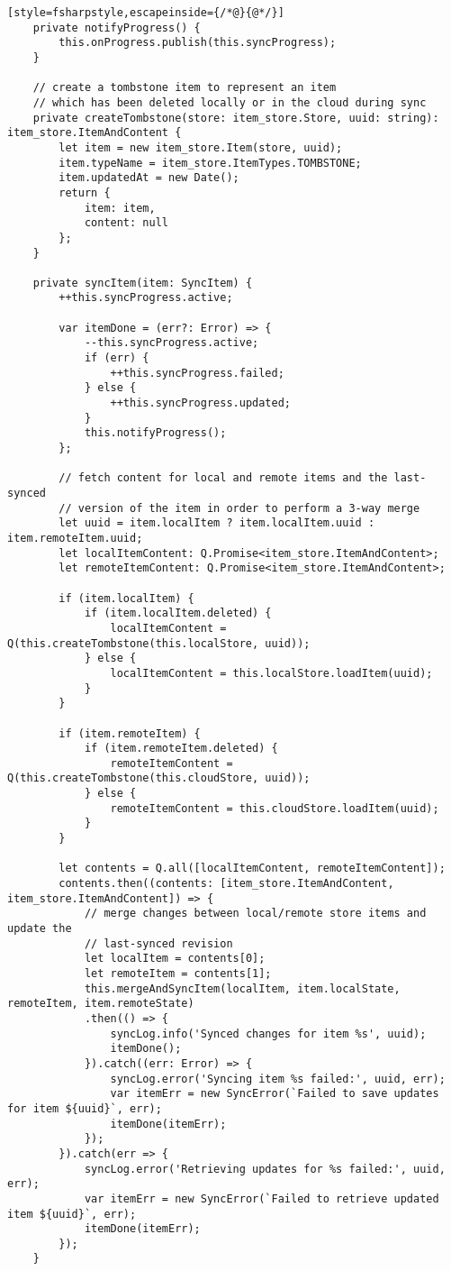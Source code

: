 \begin{lstlisting}[style=fsharpstyle,escapeinside={/*@}{@*/}]
	private notifyProgress() {
		this.onProgress.publish(this.syncProgress);
	}

	// create a tombstone item to represent an item
	// which has been deleted locally or in the cloud during sync
	private createTombstone(store: item_store.Store, uuid: string): item_store.ItemAndContent {
		let item = new item_store.Item(store, uuid);
		item.typeName = item_store.ItemTypes.TOMBSTONE;
		item.updatedAt = new Date();
		return {
			item: item,
			content: null
		};
	}

	private syncItem(item: SyncItem) {
		++this.syncProgress.active;

		var itemDone = (err?: Error) => {
			--this.syncProgress.active;
			if (err) {
				++this.syncProgress.failed;
			} else {
				++this.syncProgress.updated;
			}
			this.notifyProgress();
		};

		// fetch content for local and remote items and the last-synced
		// version of the item in order to perform a 3-way merge
		let uuid = item.localItem ? item.localItem.uuid : item.remoteItem.uuid;
		let localItemContent: Q.Promise<item_store.ItemAndContent>;
		let remoteItemContent: Q.Promise<item_store.ItemAndContent>;

		if (item.localItem) {
			if (item.localItem.deleted) {
				localItemContent = Q(this.createTombstone(this.localStore, uuid));
			} else {
				localItemContent = this.localStore.loadItem(uuid);
			}
		}

		if (item.remoteItem) {
			if (item.remoteItem.deleted) {
				remoteItemContent = Q(this.createTombstone(this.cloudStore, uuid));
			} else {
				remoteItemContent = this.cloudStore.loadItem(uuid);
			}
		}

		let contents = Q.all([localItemContent, remoteItemContent]);
		contents.then((contents: [item_store.ItemAndContent, item_store.ItemAndContent]) => {
			// merge changes between local/remote store items and update the
			// last-synced revision
			let localItem = contents[0];
			let remoteItem = contents[1];
			this.mergeAndSyncItem(localItem, item.localState, remoteItem, item.remoteState)
			.then(() => {
				syncLog.info('Synced changes for item %s', uuid);
				itemDone();
			}).catch((err: Error) => {
				syncLog.error('Syncing item %s failed:', uuid, err);
				var itemErr = new SyncError(`Failed to save updates for item ${uuid}`, err);
				itemDone(itemErr);
			});
		}).catch(err => {
			syncLog.error('Retrieving updates for %s failed:', uuid, err);
			var itemErr = new SyncError(`Failed to retrieve updated item ${uuid}`, err);
			itemDone(itemErr);
		});
	}


\end{lstlisting}
